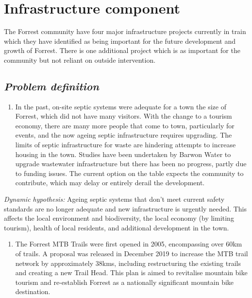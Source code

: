 \documentclass[
  11pt,
]{book}
\providecommand{\tightlist}{%
  \setlength{\itemsep}{0pt}\setlength{\parskip}{0pt}}
\begin{document}
\hypertarget{infrastructure-component}{%
\chapter{Infrastructure component}\label{infrastructure-component}}

The Forrest community have four major infrastructure projects currently in train which they have identified as being important for the future development and growth of Forrest. There is one additional project which is as important for the community but not reliant on outside intervention.

\hypertarget{problem-definition-10}{%
\section{\texorpdfstring{\emph{Problem definition}}{Problem definition}}\label{problem-definition-10}}

\begin{enumerate}
\def\labelenumi{\arabic{enumi}.}
\tightlist
\item
  In the past, on-site septic systems were adequate for a town the size of Forrest, which did not have many visitors. With the change to a tourism economy, there are many more people that come to town, particularly for events, and the now ageing septic infrastructure requires upgrading. The limits of septic infrastructure for waste are hindering attempts to increase housing in the town. Studies have been undertaken by Barwon Water to upgrade wastewater infrastructure but there has been no progress, partly due to funding issues. The current option on the table expects the community to contribute, which may delay or entirely derail the development.
\end{enumerate}

\emph{Dynamic hypothesis:}
Ageing septic systems that don't meet current safety standards are no longer adequate and new infrastructure is urgently needed. This affects the local environment and biodiversity, the local economy (by limiting tourism), health of local residents, and additional development in the town.

\begin{enumerate}
\def\labelenumi{\arabic{enumi}.}
\setcounter{enumi}{1}
\tightlist
\item
  The Forrest MTB Trails were first opened in 2005, encompassing over 60km of trails. A proposal was released in December 2019 to increase the MTB trail network by approximately 38kms, including restructuring the existing trails and creating a new Trail Head. This plan is aimed to revitalise mountain bike tourism and re-establish Forrest as a nationally significant mountain bike destination.
\end{enumerate}
\end{document}
